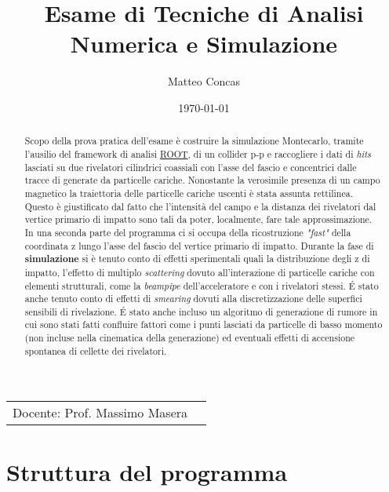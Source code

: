 \documentclass{article}
\title{Esame di Tecniche di Analisi Numerica e Simulazione} %
\author{Matteo Concas} %
\date{\today} %
\begin{document}
\maketitle %

\begin{center}
\begin{tabular}{l r}
Docente: Prof. Massimo Masera 
\end{tabular}
\end{center}

\begin{abstract}
Scopo della prova pratica dell'esame è costruire la simulazione Montecarlo, tramite l'ausilio del framework di analisi \href{http://root.cern.ch/drupal/}{ROOT},
di un collider p-p e raccogliere i dati di \textit{hits} lasciati su due rivelatori cilindrici coassiali con l'asse del fascio e concentrici dalle tracce di generate da particelle cariche.
Nonostante la verosimile presenza di un campo magnetico la traiettoria delle particelle cariche uscenti è stata assunta rettilinea.
Questo è giustificato dal fatto che l'intensità del campo e la distanza dei rivelatori dal vertice primario di impatto sono tali da poter, localmente, fare tale approssimazione.
In una seconda parte del programma ci si occupa della ricostruzione \textit{"fast"} della coordinata z lungo l'asse del fascio del vertice primario di impatto.
Durante la fase di \textbf{simulazione} si è tenuto conto di effetti sperimentali quali la distribuzione degli z di impatto, l'effetto di multiplo \textit{scattering} dovuto all'interazione di particelle cariche con elementi strutturali, come la \textit{beampipe} dell'acceleratore e con i rivelatori stessi. 
\'E stato anche tenuto conto di effetti di \textit{smearing} dovuti alla discretizzazione delle superfici sensibili di rivelazione.
\'E stato anche incluso un algoritmo di generazione di rumore in cui sono stati fatti confluire fattori come i punti lasciati da particelle di basso momento (non incluse nella cinematica della generazione) ed eventuali effetti di accensione spontanea di cellette dei rivelatori. 
\end{abstract}


\section{Struttura del programma}
\end{document}

